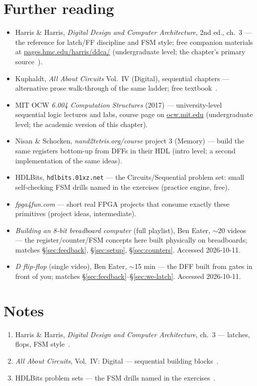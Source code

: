 \section*{Further reading}
\begin{itemize}
\item Harris \& Harris, \emph{Digital Design and Computer Architecture},
2nd ed., ch.\ 3 --- the reference for latch/FF discipline and FSM style;
free companion materials at \url{pages.hmc.edu/harris/ddca/}
(undergraduate level; the chapter's primary source~\cite{ddca}).
\item Kuphaldt, \emph{All About Circuits} Vol.\ IV (Digital),
sequential chapters --- alternative prose walk-through of the same
ladder; free textbook~\cite{aacvol4}.
\item MIT OCW \emph{6.004 Computation Structures} (2017) ---
university-level sequential logic lectures and labs, course page on
\url{ocw.mit.edu}
(undergraduate level; the academic version of this chapter).
\item Nisan \& Schocken, \emph{nand2tetris.org/course} project 3
(Memory) --- build the same registers bottom-up from DFFs in their HDL
(intro level; a second implementation of the same ideas).
\item HDLBits, \texttt{hdlbits.01xz.net} --- the Circuits/Sequential
problem set: small self-checking FSM drills named in the exercises
(practice engine, free).
\item \emph{fpga4fun.com} --- short real FPGA projects that consume
exactly these primitives (project ideas, intermediate).
\end{itemize}

\begin{rulebox}
\begin{itemize}
\item \emph{Building an 8-bit breadboard computer} (full playlist),
Ben Eater, $\sim$20 videos --- the register/counter/FSM concepts here
built physically on breadboards; matches \S\ref{sec:feedback},
\S\ref{sec:setup}, \S\ref{sec:counters}. Accessed 2026-10-11.
\item \emph{D flip-flop} (single video), Ben Eater, $\sim$15 min ---
the DFF built from gates in front of you; matches
\S\ref{sec:feedback}--\S\ref{sec:we-latch}. Accessed 2026-10-11.
\end{itemize}
\end{rulebox}

\section*{Notes}
\begin{enumerate}
\item Harris \& Harris, \emph{Digital Design and Computer Architecture},
ch.\ 3 — latches, flops, FSM style~\cite{ddca}.
\item \emph{All About Circuits}, Vol.~IV: Digital — sequential
building blocks~\cite{aacvol4}.
\item HDLBits problem sets — the FSM drills named in the
exercises~\cite{hdlbits}.
\end{enumerate}

